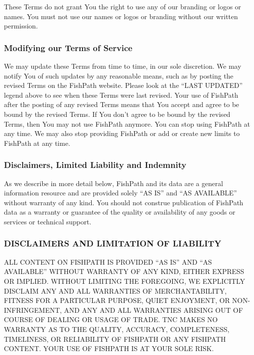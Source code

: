 \documentclass[
  11pt,
]{book}
\begin{document}
These Terms do not grant You the right to use any of our branding or logos or names. You must not use our names or logos or branding without our written permission.

\hypertarget{modifying-our-terms-of-service}{%
\subsubsection*{Modifying our Terms of Service}\label{modifying-our-terms-of-service}}

We may update these Terms from time to time, in our sole discretion. We may notify You of such updates by any reasonable means, such as by posting the revised Terms on the FishPath website. Please look at the ``LAST UPDATED'' legend above to see when these Terms were last revised. Your use of FishPath after the posting of any revised Terms means that You accept and agree to be bound by the revised Terms. If You don't agree to be bound by the revised Terms, then You may not use FishPath anymore. You can stop using FishPath at any time. We may also stop providing FishPath or add or create new limits to FishPath at any time.

\hypertarget{disclaimers-limited-liability-and-indemnity}{%
\subsubsection*{Disclaimers, Limited Liability and Indemnity}\label{disclaimers-limited-liability-and-indemnity}}

As we describe in more detail below, FishPath and its data are a general information resource and are provided solely ``AS IS'' and ``AS AVAILABLE'' without warranty of any kind. You should not construe publication of FishPath data as a warranty or guarantee of the quality or availability of any goods or services or technical support.

\hypertarget{disclaimers-and-limitation-of-liability}{%
\subsubsection*{DISCLAIMERS AND LIMITATION OF LIABILITY}\label{disclaimers-and-limitation-of-liability}}

ALL CONTENT ON FISHPATH IS PROVIDED ``AS IS'' AND ``AS AVAILABLE'' WITHOUT WARRANTY OF ANY KIND, EITHER EXPRESS OR IMPLIED. WITHOUT LIMITING THE FOREGOING, WE EXPLICITLY DISCLAIM ANY AND ALL WARRANTIES OF MERCHANTABILITY, FITNESS FOR A PARTICULAR PURPOSE, QUIET ENJOYMENT, OR NON-INFRINGEMENT, AND ANY AND ALL WARRANTIES ARISING OUT OF COURSE OF DEALING OR USAGE OF TRADE. TNC MAKES NO WARRANTY AS TO THE QUALITY, ACCURACY, COMPLETENESS, TIMELINESS, OR RELIABILITY OF FISHPATH OR ANY FISHPATH CONTENT. YOUR USE OF FISHPATH IS AT YOUR SOLE RISK.
\end{document}
